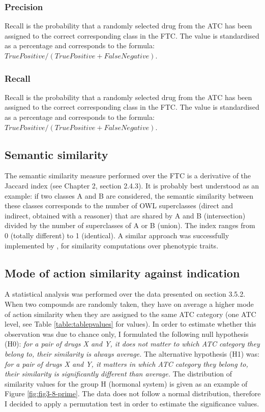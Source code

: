 \subsubsection{Precision}
Recall is the probability that a randomly selected drug from the ATC has been assigned to the correct corresponding class in the FTC. The value is standardised as a percentage and corresponds to the formula: $ True Positive / (True Positive + False Negative) $.

\subsubsection{Recall}
Recall is the probability that a randomly selected drug from the ATC has been assigned to the correct corresponding class in the FTC. The value is standardised as a percentage and corresponds to the formula: $ True Positive / (True Positive + False Negative) $.

\subsection{Semantic similarity}
The semantic similarity measure performed over the FTC is a derivative of the Jaccard index \citep{jaccard1912distribution} \citep{rogers1960computer} (see Chapter 2, section 2.4.3). It is probably best understood as an example: if two classes A and B are considered, the semantic similarity between these classes corresponds to the number of OWL superclasses (direct and indirect, obtained with a reasoner) that are shared by A and B (intersection) divided by the number of superclasses of A or B (union). The index ranges from 0 (totally different) to 1 (identical). A similar approach was successfully implemented by \cite{hoehndorf2011phenomenet}, for similarity computations over phenotypic traits.

\subsection{Mode of action similarity against indication}
\label{moa-pvalues}
A statistical analysis was performed over the data presented on section 3.5.2. When two compounds are randomly taken, they have on average a higher mode of action similarity when they are assigned to the same ATC category (one ATC level, see Table \ref{table:tablepvalues} for values). In order to estimate whether this observation was due to chance only, I formulated the following null hypothesis (H0): \emph{for a pair of drugs X and Y, it does not matter to which ATC category they belong to, their similarity is always average.} The alternative hypothesis (H1) was: \emph{for a pair of drugs X and Y, it matters in which ATC category they belong to, their similarity is significantly different than average.}
The distribution of similarity values for the group H (hormonal system) is given as an example of Figure \ref{fig:fig3-8-prime}. The data does not follow a normal distribution, therefore I decided to apply a permutation test in order to estimate the significance values.

